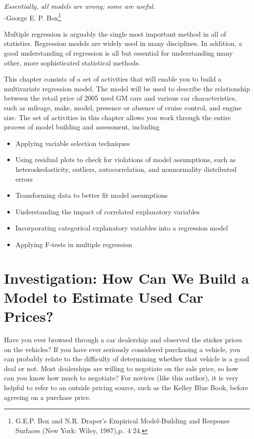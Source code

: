 \documentclass[
]{report}
\providecommand{\tightlist}{%
  \setlength{\itemsep}{0pt}\setlength{\parskip}{0pt}}
\begin{document}
{ \emph{Essentially, all models are wrong; some are useful.}}\\
{ -George E. P. Box\footnote{G.E.P. Box and N.R. Draper's Empirical Model-Building and Response Surfaces (New York: Wiley, 1987),p.~4 24.}
}

Multiple regression is arguably the single most important method in all of statistics.
Regression models are widely used in many disciplines. In addition, a good understanding
of regression is all but essential for understanding many other, more sophisticated
statistical methods.

This chapter consists of a set of activities that will enable you to build a multivariate
regression model. The model will be used to describe the relationship between the retail price of 2005 used GM cars and various car characteristics, such as mileage, make, model, presence or absence of cruise control, and engine size. The set of activities in this chapter allows you work through the entire process of model building and assessment, including

\begin{itemize}
\tightlist
\item
  Applying variable selection techniques
\item
  Using residual plots to check for violations of model assumptions, such as heteroskedasticity, outliers, autocorrelation, and nonnormality distributed errors
\item
  Transforming data to better fit model assumptions
\item
  Understanding the impact of correlated explanatory variables
\item
  Incorporating categorical explanatory variables into a regression model
\item
  Applying F-tests in multiple regression
\end{itemize}

\newpage

\hypertarget{investigation-how-can-we-build-a-model-to-estimate-used-car-prices}{%
\section{\texorpdfstring{\textbf{Investigation: How Can We Build a Model to Estimate Used Car Prices?}}{Investigation: How Can We Build a Model to Estimate Used Car Prices?}}\label{investigation-how-can-we-build-a-model-to-estimate-used-car-prices}}

Have you ever browsed through a car dealership and observed the sticker prices on the vehicles? If you have ever seriously considered purchasing a vehicle, you can probably relate to the difficulty of determining whether that vehicle is a good deal or not. Most dealerships are willing to negotiate on the sale price, so how can you know how much to negotiate? For novices (like this author), it is very helpful to refer to an outside
pricing source, such as the Kelley Blue Book, before agreeing on a purchase price.
\end{document}

